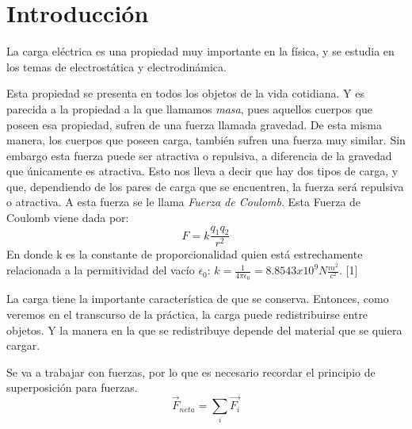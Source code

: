 \documentclass[article,12pt]{elsarticle}
\begin{document}
\section{Introducción}
La carga eléctrica es una propiedad muy importante en la física, y se estudia en los temas de electrostática y electrodinámica.

Esta propiedad se presenta en todos los objetos de la vida cotidiana. Y es parecida a la propiedad a la que llamamos \textit{masa}, pues aquellos cuerpos que poseen esa propiedad, sufren de una fuerza llamada gravedad. De esta misma manera, los cuerpos que poseen carga, también sufren una fuerza muy similar.
Sin embargo esta fuerza puede ser atractiva o repulsiva, a diferencia de la gravedad que únicamente es atractiva. Esto nos lleva a decir que hay dos tipos de carga, y que, dependiendo de los pares de carga que se encuentren, la fuerza será repulsiva o atractiva. A esta fuerza se le llama \textit{Fuerza de Coulomb}. Esta Fuerza de Coulomb viene dada por:
\begin{equation}
    F=k\frac{q_{1}q_{2}}{r^2}
\end{equation}
En donde k es la constante de proporcionalidad quien está estrechamente relacionada a la permitividad del vacío $\epsilon_0$: $k=\frac{1}{4\pi\epsilon_{0}}=8.8543x10^9 N\frac{m^2}{c^2}$. [1]

La carga tiene la importante característica de que se conserva. Entonces, como veremos en el transcurso de la práctica, la carga puede redistribuirse entre objetos. Y la manera en la que se redistribuye depende del material que se quiera cargar.

Se va a trabajar con fuerzas, por lo que es necesario recordar el principio de superposición para fuerzas.
\begin{equation}
    \Vec{F}_{neta} =\sum_i \Vec{F_i}
\end{equation}
\end{document}
